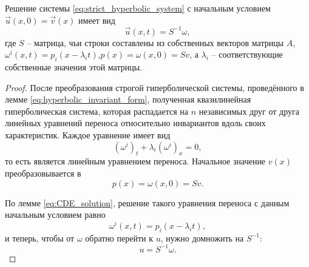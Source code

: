 \documentclass[../main.tex]{subfile}
\begin{document}
\begin{theorem}
	Решение системы \eqref{eq:strict_hyperbolic_system} с начальным условием
	$\vec{u}(x,0)=\vec{v}(x)$ имеет вид
	\[\vec{u}(x,t)=S^{-1}\omega,\]
	где $S$ -- матрица, чьи строки составлены из собственных векторов
	матрицы $A$, $\omega^i(x,t)=p_i(x-\lambda_i t)$,\quad $p(x)=
	\omega(x,0)=Sv$, а $\lambda_i$ -- соответствующие собственные значения
	этой матрицы.
\end{theorem}

\begin{proof}
	После преобразования строгой гиперболической системы, проведённого в
	лемме \eqref{eq:hyperbolic_invariant_form}, полученная квазилинейная
	гиперболическая система, которая распадается на $n$ независимых друг от
	друга линейных уравнений переноса относительно инвариантов вдоль своих
	характеристик. Каждое уравнение имеет вид
	\[(\omega^i)_t+\lambda_i(\omega^i)_x=0,\]
	то есть является линейным уравнением переноса. Начальное значение $v(x)$
	преобразовывается в
	\[p(x)=\omega(x,0)=Sv.\]

	По лемме \eqref{eq:CDE_solution}, решение такого уравнения переноса
	с данным начальным условием равно
	\[\omega^i(x,t)=p_i(x-\lambda_i t),\]
	и теперь, чтобы от $\omega$ обратно перейти к $u$, нужно домножить
	на $S^{-1}$:
	\[u=S^{-1}\omega.\]
\end{proof}
\end{document}
